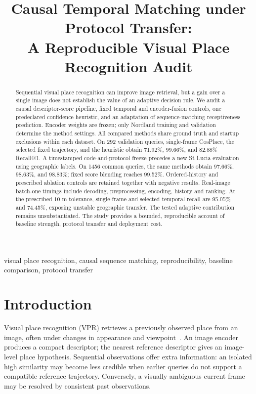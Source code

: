 \documentclass[conference]{IEEEtran}
\title{Causal Temporal Matching under Protocol Transfer:\\A Reproducible Visual Place Recognition Audit}
\author{\IEEEauthorblockN{Mingyang Zhou}\IEEEauthorblockA{University of Chinese Academy of Sciences\\\textit{Additional authors and correspondence pending}}}
\begin{document}
\maketitle
\begin{abstract}
Sequential visual place recognition can improve image retrieval, but a gain over a single image does not establish the value of an adaptive decision rule. We audit a causal descriptor-score pipeline, fixed temporal and encoder-fusion controls, one predeclared confidence heuristic, and an adaptation of sequence-matching receptiveness prediction. Encoder weights are frozen; only Nordland training and validation determine the method settings. All compared methods share ground truth and startup exclusions within each dataset. On 292 validation queries, single-frame CosPlace, the selected fixed trajectory, and the heuristic obtain 71.92\%, 99.66\%, and 82.88\% Recall@1. A timestamped code-and-protocol freeze precedes a new St Lucia evaluation using geographic labels. On 1456 common queries, the same methods obtain 97.66\%, 98.63\%, and 98.83\%; fixed score blending reaches 99.52\%. Ordered-history and prescribed ablation controls are retained together with negative results. Real-image batch-one timings include decoding, preprocessing, encoding, history and ranking. At the prescribed $10$ m tolerance, single-frame and selected temporal recall are 95.05\% and 74.45\%, exposing unstable geographic transfer. The tested adaptive contribution remains unsubstantiated. The study provides a bounded, reproducible account of baseline strength, protocol transfer and deployment cost.
\end{abstract}
\begin{IEEEkeywords}visual place recognition, causal sequence matching, reproducibility, baseline comparison, protocol transfer\end{IEEEkeywords}

\section{Introduction}
Visual place recognition (VPR) retrieves a previously observed place from an image, often under changes in appearance and viewpoint~\cite{tutorial}. An image encoder produces a compact descriptor; the nearest reference descriptor gives an image-level place hypothesis. Sequential observations offer extra information: an isolated high similarity may become less credible when earlier queries do not support a compatible reference trajectory. Conversely, a visually ambiguous current frame may be resolved by consistent past observations.
\end{document}
